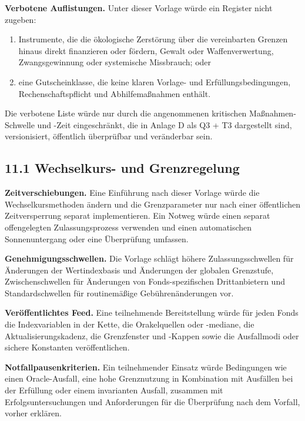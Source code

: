 \documentclass[11pt]{article}
\begin{document}
\textbf{Verbotene Auflistungen.} Unter dieser Vorlage würde ein Register nicht zugeben:

\begin{enumerate}[leftmargin=*]
\item Instrumente, die die ökologische Zerstörung über die vereinbarten Grenzen hinaus direkt finanzieren oder fördern, Gewalt oder Waffenverwertung, Zwangsgewinnung oder systemische Missbrauch; oder
\item eine Gutscheinklasse, die keine klaren Vorlage- und Erfüllungsbedingungen, Rechenschaftspflicht und Abhilfemaßnahmen enthält.
\end{enumerate}
Die verbotene Liste würde nur durch die angenommenen kritischen Maßnahmen-Schwelle und -Zeit eingeschränkt, die in Anlage D als Q3 + T3 dargestellt sind, versionisiert, öffentlich überprüfbar und veränderbar sein.

\subsection*{11.1 Wechselkurs- und Grenzregelung}

\textbf{Zeitverschiebungen.} Eine Einführung nach dieser Vorlage würde die Wechselkursmethoden ändern und die Grenzparameter nur nach einer öffentlichen Zeitversperrung separat implementieren. Ein Notweg würde einen separat offengelegten Zulassungsprozess verwenden und einen automatischen Sonnenuntergang oder eine Überprüfung umfassen.

\textbf{Genehmigungsschwellen.} Die Vorlage schlägt höhere Zulassungsschwellen für Änderungen der Wertindexbasis und Änderungen der globalen Grenzstufe, Zwischenschwellen für Änderungen von Fonds-spezifischen Drittanbietern und Standardschwellen für routinemäßige Gebührenänderungen vor.

\textbf{Veröffentlichtes Feed.} Eine teilnehmende Bereitstellung würde für jeden Fonds die Indexvariablen in der Kette, die Orakelquellen oder -mediane, die Aktualisierungskadenz, die Grenzfenster und -Kappen sowie die Ausfallmodi oder sichere Konstanten veröffentlichen.

\textbf{Notfallpausenkriterien.} Ein teilnehmender Einsatz würde Bedingungen wie einen Oracle-Ausfall, eine hohe Grenznutzung in Kombination mit Ausfällen bei der Erfüllung oder einem invarianten Ausfall, zusammen mit Erfolgsuntersuchungen und Anforderungen für die Überprüfung nach dem Vorfall, vorher erklären.
\end{document}
